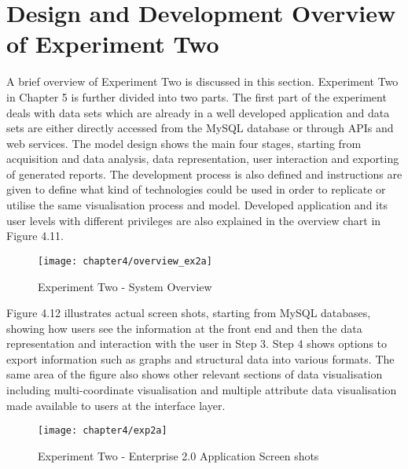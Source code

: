 \section{Design and Development Overview of Experiment Two}

A brief overview of Experiment Two is discussed in this section. Experiment Two in Chapter 5 is further divided into two parts. The first part of the experiment deals with data sets which are already in a well developed application and data sets are either directly accessed from the MySQL database or through APIs and web services. The model design shows the main four stages, starting from acquisition and data analysis, data representation, user interaction and exporting of generated reports. The development process is also defined and instructions are given to define what kind of technologies could be used in order to replicate or utilise the same visualisation process and model. Developed application and its user levels with different privileges are also explained in the overview chart in Figure 4.11.

\begin{figure}
\centering
\texttt{[image: chapter4/overview\_ex2a]}
\caption{Experiment Two  - System Overview}
\end{figure}

Figure 4.12 illustrates actual screen shots, starting from MySQL databases, showing how users see the information at the front end and then the data representation and interaction with the user in Step 3. Step 4 shows options to export information such as graphs and structural data into various formats. The same area of the figure also shows other relevant sections of data visualisation including multi-coordinate visualisation and multiple attribute data visualisation made available to users at the interface layer.

\begin{figure}
\centering
\texttt{[image: chapter4/exp2a]}
\caption{Experiment Two  - Enterprise 2.0 Application Screen shots}
\end{figure}


